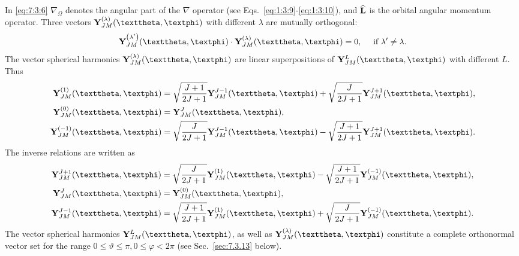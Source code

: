 In \eqref{eq:7:3:6} $\nabla_{\Omega}$ denotes the angular part of the $\nabla$ operator (see Eqs.~\eqref{eq:1:3:9}-\eqref{eq:1:3:10}), and $\widehat{\mathbf{L}}$ is the orbital angular momentum operator. Three vectors $\vect{Y}_{J M}^{(\lambda)}(\vartheta, \varphi)$ with different $\lambda$ are mutually orthogonal:
\begin{equation}
\vect{Y}_{J M}^{\left(\lambda^{\prime}\right)}(\vartheta, \varphi) \cdot \vect{Y}_{J M}^{(\lambda)}(\vartheta, \varphi)=0, \quad \text { if } \lambda^{\prime} \neq \lambda. \label{eq:7:3:8}
\end{equation}
The vector spherical harmonics $\vect{Y}_{J M}^{(\lambda)}(\vartheta, \varphi)$ are linear superpositions of $\vect{Y}_{J M}^{L}(\vartheta, \varphi)$ with different $L$. Thus
\begin{align}
\vect{Y}_{J M}^{(1)}(\vartheta, \varphi) & =\sqrt{\frac{J+1}{2 J+1}} \vect{Y}_{J M}^{J-1}(\vartheta, \varphi)+\sqrt{\frac{J}{2 J+1}} \vect{Y}_{J M}^{J+1}(\vartheta, \varphi), \notag\\
\vect{Y}_{J M}^{(0)}(\vartheta, \varphi) & =\vect{Y}_{J M}^{J}(\vartheta, \varphi), \label{eq:7:3:9}\\
\vect{Y}_{J M}^{(-1)}(\vartheta, \varphi) & =\sqrt{\frac{J}{2 J+1}} \vect{Y}_{J M}^{J-1}(\vartheta, \varphi)-\sqrt{\frac{J+1}{2 J+1}} \vect{Y}_{J M}^{J+1}(\vartheta, \varphi). \notag
\end{align}
The inverse relations are written as
\begin{align}
\vect{Y}_{J M}^{J+1}(\vartheta, \varphi) & =\sqrt{\frac{J}{2 J+1}} \vect{Y}_{J M}^{(1)}(\vartheta, \varphi)-\sqrt{\frac{J+1}{2 J+1}} \vect{Y}_{J M}^{(-1)}(\vartheta, \varphi), \notag\\
\vect{Y}_{J M}^{J}(\vartheta, \varphi) & =\vect{Y}_{J M}^{(0)}(\vartheta, \varphi), \label{eq:7:3:10}\\
\vect{Y}_{J M}^{J-1}(\vartheta, \varphi) & =\sqrt{\frac{J+1}{2 J+1}} \vect{Y}_{J M}^{(1)}(\vartheta, \varphi)+\sqrt{\frac{J}{2 J+1}} \vect{Y}_{J M}^{(-1)}(\vartheta, \varphi). \notag
\end{align}
The vector spherical harmonics $\vect{Y}_{J M}^{L}(\vartheta, \varphi)$, as well as $\vect{Y}_{J M}^{(\lambda)}(\vartheta, \varphi)$ constitute a complete orthonormal vector set for the range $0 \leq \vartheta \leq \pi, 0 \leq \varphi<2 \pi$ (see Sec.~\ref{sec:7.3.13} below).

